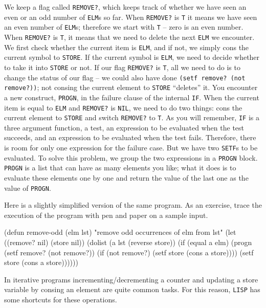 \documentclass[a4paper,11pt]{article}
\begin{document}
\begin{uenum}
\begin{uenumi}
We keep a flag called \Verb+REMOVE?+, which keeps track of whether we have seen an even or an odd number of \Verb+ELM+s so far. When \Verb+REMOVE?+ is \Verb+T+ it means we have seen an even number of \Verb+ELM+s; therefore we start with \Verb+T+ -- zero is an even number. When \Verb+REMOVE?+ is \Verb+T+, it means that we need to delete the next \Verb+ELM+ we encounter. We first check whether the current item is \Verb+ELM+, and if not, we simply cons the current symbol to \Verb+STORE+. If the current symbol is \Verb+ELM+, we need to decide whether to take it into \Verb+STORE+ or not. If our flag \Verb+REMOVE?+ is \Verb+T+, all we need to do is to change the status of our flag -- we could also have done \Verb+(setf remove? (not remove?))+; not consing the current element to \Verb+STORE+ ``deletes'' it. You encounter a new construct, \Verb+PROGN+, in the failure clause of the internal \Verb+IF+. When the current item is equal to \Verb+ELM+ and \Verb+REMOVE?+ is \Verb+NIL+, we need to do two things: cons the current element to \Verb+STORE+ and switch \Verb+REMOVE?+ to \Verb+T+. As you will remember, \Verb+IF+ is a three argument function, a test, an expression to be evaluated when the test succeeds, and an expression to be evaluated when the test fails. Therefore, there is room for only one expression for the failure case. But we have two \Verb+SETF+s to be evaluated. To solve this problem, we group the two expressions in a \Verb+PROGN+ block. \Verb+PROGN+ is a list that can have as many elements you like; what it does is to evaluate these elements one by one and return the value of the last one as the value of \Verb+PROGN+. 

\item Here is a slightly simplified version of the same program. As an exercise, trace the execution of the program with pen and paper on a sample input.

\begin{lispcode}
(defun remove-odd (elm lst)
  "remove odd occurrences of elm from lst"
  (let ((remove? nil)
		(store nil))
	(dolist (a lst (reverse store))
	  (if (equal a elm)
		(progn
		  (setf remove? (not remove?))
		  (if (not remove?)
			(setf store (cons a store))))
		(setf store (cons a store))))))
\end{lispcode}

\end{uenumi}

\item In iterative programs incrementing/decrementing a counter and updating a store variable by consing an element are quite common tasks. For this reason, \Verb+LISP+ has some shortcuts for these operations. 


\end{uenum}
\end{document}
